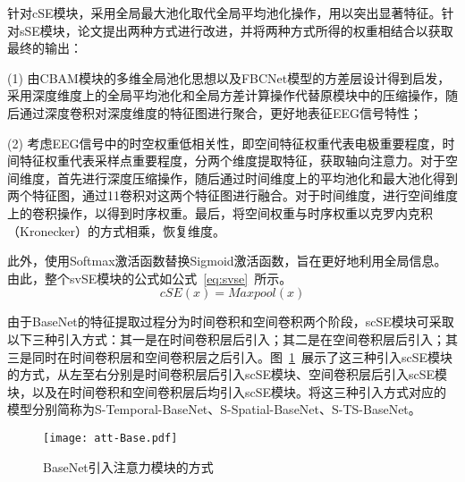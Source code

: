 针对cSE模块，采用全局最大池化取代全局平均池化操作，用以突出显著特征。针对sSE模块，论文提出两种方式进行改进，并将两种方式所得的权重相结合以获取最终的输出：

(1) 由CBAM模块的多维全局池化思想以及FBCNet模型的方差层设计\cite{mane2021fbcnet}得到启发，采用深度维度上的全局平均池化和全局方差计算操作代替原模块中的压缩操作，随后通过深度卷积对深度维度的特征图进行聚合，更好地表征EEG信号特性；

(2) 考虑EEG信号中的时空权重低相关性，即空间特征权重代表电极重要程度，时间特征权重代表采样点重要程度，分两个维度提取特征，获取轴向注意力。对于空间维度，首先进行深度压缩操作，随后通过时间维度上的平均池化和最大池化得到两个特征图，通过1\times1卷积对这两个特征图进行融合。对于时间维度，进行空间维度上的卷积操作，以得到时序权重。最后，将空间权重与时序权重以克罗内克积（Kronecker）的方式相乘，恢复维度。

此外，使用Softmax激活函数替换Sigmoid激活函数，旨在更好地利用全局信息。由此，整个svSE模块的公式如公式~\ref{eq:svse}~所示。
\begin{equation}
    cSE(x)=Maxpool(x)
    \label{eq:svse}
\end{equation}


由于BaseNet的特征提取过程分为时间卷积和空间卷积两个阶段，scSE模块可采取以下三种引入方式：其一是在时间卷积层后引入；其二是在空间卷积层后引入；其三是同时在时间卷积层和空间卷积层之后引入。图~\ref{fig:att-Base}~展示了这三种引入scSE模块的方式，从左至右分别是时间卷积层后引入scSE模块、空间卷积层后引入scSE模块，以及在时间卷积和空间卷积层后均引入scSE模块。将这三种引入方式对应的模型分别简称为S-Temporal-BaseNet、S-Spatial-BaseNet、S-TS-BaseNet。
\begin{figure}
  \centering
  \texttt{[image: att-Base.pdf]}
  \caption{BaseNet引入注意力模块的方式}
  \label{fig:att-Base}
\end{figure}

